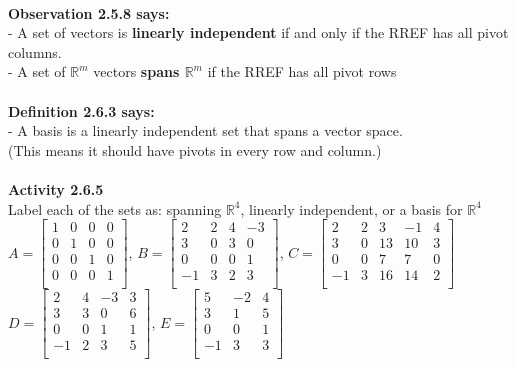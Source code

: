 \documentclass{article}
\begin{document}
\\
\textbf{Observation 2.5.8 says:}\\
- A set of vectors is \textbf{linearly independent} if and only if the RREF has all pivot columns.\\
- A set of $\mathbb{R}^{m}$ vectors \textbf{spans $\mathbb{R}^{m}$} if the RREF has all pivot rows\\
\\
\textbf{Definition 2.6.3 says:}\\
- A basis is a linearly independent set that spans a vector space. \\
(This means it should have pivots in every row and column.)\\
\\
\textbf{Activity 2.6.5}\\
Label each of the sets as: spanning $\mathbb{R}^{4}$, linearly independent, or a basis for $\mathbb{R}^{4}$
\\
$
A = \begin{bmatrix} 
1 & 0 & 0 & 0 \\ 
0 & 1 & 0 & 0 \\
0 & 0 & 1 & 0 \\
0 & 0 & 0 & 1 \\
\end{bmatrix}
$, $
B = \begin{bmatrix} 
2 & 2 & 4 & -3 \\ 
3 & 0 & 3 & 0 \\
0 & 0 & 0 & 1 \\
-1 & 3 & 2 & 3 \\
\end{bmatrix}
$, $
C = \begin{bmatrix} 
2 & 2 & 3 & -1 & 4 \\ 
3 & 0 & 13 & 10 & 3 \\ 
0 & 0 & 7 & 7 & 0 \\ 
-1 & 3 & 16 & 14 & 2 \\ 
\end{bmatrix}
$\\$D = \begin{bmatrix} 
2 & 4 & -3 & 3 \\ 
3 & 3 & 0 & 6 \\
0 & 0 & 1 & 1 \\
-1 & 2 & 3 & 5 \\
\end{bmatrix}
$, $E = \begin{bmatrix} 
5 & -2 & 4\\ 
3 & 1 & 5\\
0 & 0 & 1\\
-1 & 3 & 3\\
\end{bmatrix}
$\\
\\
\end{document}
